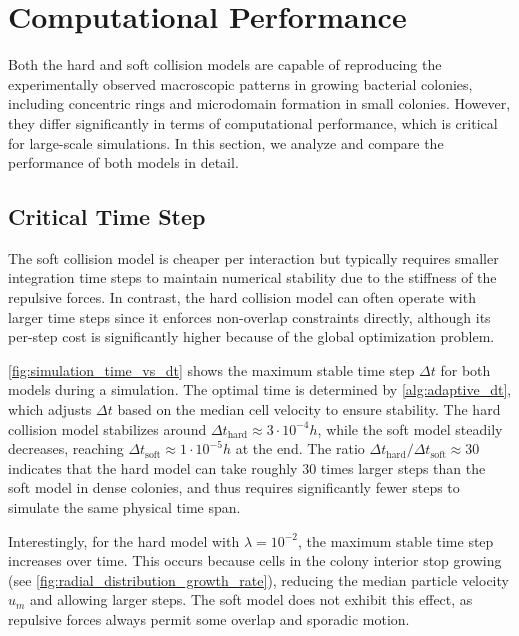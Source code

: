 \documentclass[conference]{IEEEtran}
\begin{document}
\section{Computational Performance}
\label{sec:performance_analysis}

Both the hard and soft collision models are capable of reproducing the experimentally observed macroscopic patterns in growing bacterial colonies, including concentric rings and microdomain formation in small colonies. However, they differ significantly in terms of computational performance, which is critical for large-scale simulations. In this section, we analyze and compare the performance of both models in detail.


\subsection{Critical Time Step}

The soft collision model is cheaper per interaction but typically requires smaller integration time steps to maintain numerical stability due to the stiffness of the repulsive forces. In contrast, the hard collision model can often operate with larger time steps since it enforces non-overlap constraints directly, although its per-step cost is significantly higher because of the global optimization problem.

\autoref{fig:simulation_time_vs_dt} shows the maximum stable time step $\Delta t$ for both models during a simulation. The optimal time is determined by \autoref{alg:adaptive_dt}, which adjusts $\Delta t$ based on the median cell velocity to ensure stability. The hard collision model stabilizes around ${\Delta t}_{\text{hard}} \approx 3 \cdot 10^{-4} h$, while the soft model steadily decreases, reaching ${\Delta t}_{\text{soft}} \approx 1 \cdot 10^{-5} h$ at the end. The ratio ${\Delta t}_{\text{hard}}/{\Delta t}_{\text{soft}} \approx 30$ indicates that the hard model can take roughly 30 times larger steps than the soft model in dense colonies, and thus requires significantly fewer steps to simulate the same physical time span.

Interestingly, for the hard model with $\lambda=10^{-2}$, the maximum stable time step increases over time. This occurs because cells in the colony interior stop growing (see \autoref{fig:radial_distribution_growth_rate}), reducing the median particle velocity $u_m$ and allowing larger steps. The soft model does not exhibit this effect, as repulsive forces always permit some overlap and sporadic motion.
\end{document}
